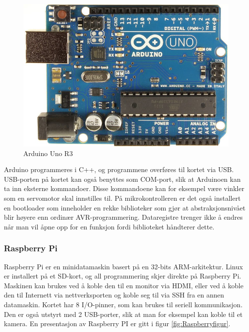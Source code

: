 \begin{figure}[h!]
\centering
\includegraphics[scale = 0.25]{img/arduinoBoard.jpg}
\caption{Arduino Uno R3 \cite{Arduino}}
\label{fig:Arduino}
\end{figure}

Arduino programmeres i C++, og programmene overføres til kortet via USB. USB-porten på kortet kan også benyttes som COM-port, slik at Arduinoen kan ta inn eksterne kommandoer. Disse kommandoene kan for eksempel være vinkler som en servomotor skal innstilles til. På mikrokontrolleren er det også installert en bootloader som inneholder en rekke biblioteker som gjør at abstraksjonsnivået blir høyere enn ordinær AVR-programmering. Dataregistre trenger ikke å endres når man vil åpne opp for en funksjon fordi biblioteket håndterer dette.

\subsubsection{Raspberry Pi}
\label{sec:Pi}
Raspberry Pi er en minidatamaskin basert på en 32-bits ARM-arkitektur. Linux er installert på et SD-kort, og all programmering skjer direkte på Raspberry Pi. Maskinen kan brukes ved å koble den til en monitor via HDMI, eller ved å koble den til Internett via nettverksporten og koble seg til via SSH fra en annen datamaskin. Kortet har 8 I/O-pinner, som kan brukes til seriell kommunikasjon. Den er også utstyrt med 2 USB-porter, slik at man for eksempel kan koble til et kamera. En presentasjon av Raspberry PI er gitt i figur \ref{fig:Raspberryfigur}.

